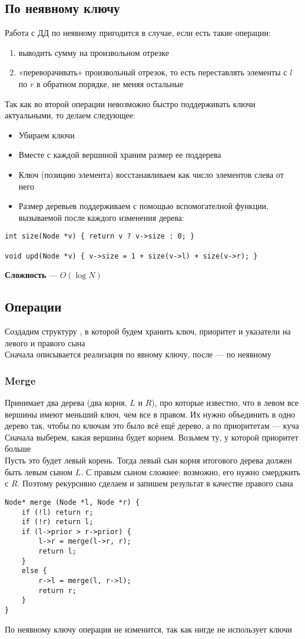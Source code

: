 \documentclass[a4paper]{article}
\begin{document}
\subsection{По неявному ключу}
Работа с ДД по неявному пригодится в случае, если есть такие операции:
\begin{enumerate}
    \item выводить сумму на произвольном отрезке
    \item «переворачивать» произвольный отрезок, то есть переставлять элементы с $l$ по $r$ в обратном порядке, не меняя остальные
\end{enumerate}
Так как во второй операции невозможно быстро поддерживать ключи актуальными, то делаем следующее:
\begin{itemize}
    \item Убираем ключи
    \item Вместе с каждой вершиной храним размер ее поддерева
    \item Ключ (позицию элемента) восстанавливаем как число элементов слева от него
    \item Размер деревьев поддерживаем с помощью вспомогателной функции, вызываемой после каждого изменения дерева:
\end{itemize}
\begin{lstlisting}
int size(Node *v) { return v ? v->size : 0; }

void upd(Node *v) { v->size = 1 + size(v->l) + size(v->r); }
\end{lstlisting}
\textbf{Сложность} — $O(\log N)$
\subsection{Операции}
Создадим структуру , в которой будем хранить ключ, приоритет и указатели на левого и правого сына\\[2mm]
\indent Сначала описывается реализация по явному ключу, после — по неявному
\subsubsection{Merge}
Принимает два дерева (два корня, $L$ и $R$), про которые известно, что в левом все вершины имеют меньший ключ, чем все в правом. Их нужно объединить в одно дерево так, чтобы по ключам это было всё ещё дерево, а по приоритетам — куча\\[2mm]
\indent Сначала выберем, какая вершина будет корнем. Возьмем ту, у которой приоритет больше\\[2mm]
\indent Пусть это будет левый корень. Тогда левый сын корня итогового дерева должен быть левым сыном $L$. С правым сыном сложнее: возможно, его нужно смерджить с $R$. Поэтому рекурсивно сделаем  и запишем результат в качестве правого сына
\begin{lstlisting}
Node* merge (Node *l, Node *r) {
    if (!l) return r;
    if (!r) return l;
    if (l->prior > r->prior) {
        l->r = merge(l->r, r);
        return l;
    }
    else {
        r->l = merge(l, r->l);
        return r;
    }
}
\end{lstlisting}
По неявному ключу операция не изменится, так как нигде не использует ключи
\end{document}
